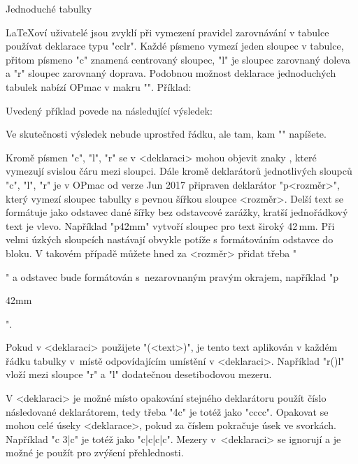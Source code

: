 \sec Jednoduché tabulky

\LaTeX{}oví uživatelé jsou zvyklí při vymezení pravidel zarovnávání v
tabulce používat deklarace typu "{cclr}". Každé písmeno vymezí jeden sloupec
v tabulce, přitom písmeno "c" znamená centrovaný sloupec, "l" je sloupec
zarovnaný doleva a "r" sloupec zarovnaný doprava.
Podobnou možnost deklarace jednoduchých tabulek nabízí
OPmac v makru "". Příklad:

\begtt
{}
\endtt

Uvedený příklad povede na následující výsledek:

\medskip
\hfil{}
\medskip

Ve skutečnosti výsledek nebude uprostřed řádku, ale tam, kam "\table"
napíšete. 

Kromě písmen "c", "l", "r" se v <deklaraci> mohou objevit znaky
, které vymezují svislou čáru mezi sloupci. 
Dále kromě deklarátorů jednotlivých sloupců "c", "l", "r" je v OPmac od verze Jun
2017 připraven deklarátor "p{<rozměr>}", který vymezí sloupec
tabulky s pevnou šířkou sloupce <rozměr>. Delší text se formátuje jako odstavec
dané šířky bez odstavcové zarážky, kratší jednořádkový text je vlevo. Například
"p{42mm}"
vytvoří sloupec pro text široký 42\,mm. Při velmi úzkých sloupcích nastávají
obvykle potíže s formátováním odstavce do bloku. V takovém případě můžete
hned za <rozměr> přidat třeba "\raggedright" a odstavec bude formátován 
s~nezarovnaným pravým okrajem, například "p{42mm\raggedright}".

Pokud v <deklaraci> použijete "(<text>)", je tento text aplikován v každém
řádku tabulky v~místě odpovídajícím umístění v <deklaraci>. Například "r(\kern10pt)l"
vloží mezi sloupce "r" a "l" dodatečnou desetibodovou mezeru.

V <deklaraci> je možné místo opakování stejného deklarátoru použít číslo
následované deklarátorem, tedy třeba "4c" je totéž jako "cccc". Opakovat se
mohou celé úseky <deklarace>, pokud za číslem pokračuje úsek ve svorkách.
Například "c 3{|c}" je totéž jako "c|c|c|c".  Mezery v~<deklaraci> se ignorují a
je možné je použít pro zvýšení přehlednosti.

